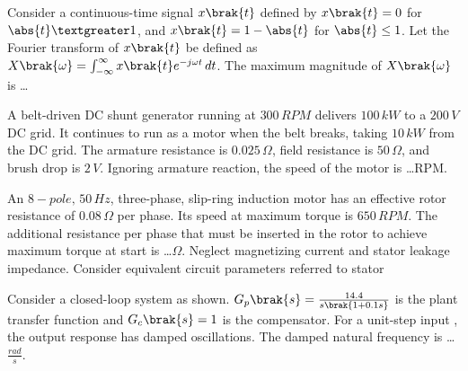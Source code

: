  \iffalse
\chapter{2021}
\author{EE24BTECH11021 - Eshan Ray}
\section{ee}
\fi
    \item Consider a continuous-time signal $x\brak{t}$ defined by $x\brak{t}=0$ for $\abs{t}\textgreater1$, and $x\brak{t}=1-\abs{t}$ for $\abs{t}\leq1$. Let the Fourier transform of $x\brak{t}$ be defined as $X\brak{\omega}=\int_{-\infty}^{\infty}x\brak{t}e^{-j\omega t}\,dt$. The maximum magnitude of $X\brak{\omega}$ is \dots
    \item A belt-driven DC shunt generator running at $300\, RPM$ delivers $100\, kW$ to a $200\, V$ DC grid. It continues to run as a motor when the belt breaks, taking $10\, kW$ from the DC grid. The armature resistance is $0.025\, \Omega$, field resistance is $50\, \Omega$, and brush drop is $2\, V$. Ignoring armature reaction, the speed of the motor is \dots RPM. 
    \item An $8-pole,\, 50\, Hz$, three-phase, slip-ring induction motor has an effective rotor resistance of $0.08\, \Omega$ per phase. Its speed at maximum torque is $650\, RPM$. The additional resistance per phase that must be inserted in the rotor to achieve maximum torque at start is \dots $\Omega$.  Neglect magnetizing current and stator leakage impedance. Consider equivalent circuit parameters referred to stator
    \item Consider a closed-loop system as shown. $G_p\brak{s}=\frac{14.4}{s\brak{1+0.1s}}$ is the plant transfer function and $G_c\brak{s}=1$ is the compensator. For a unit-step input , the output response has damped oscillations. The damped natural frequency is \dots $\frac{rad}{s}$. 


